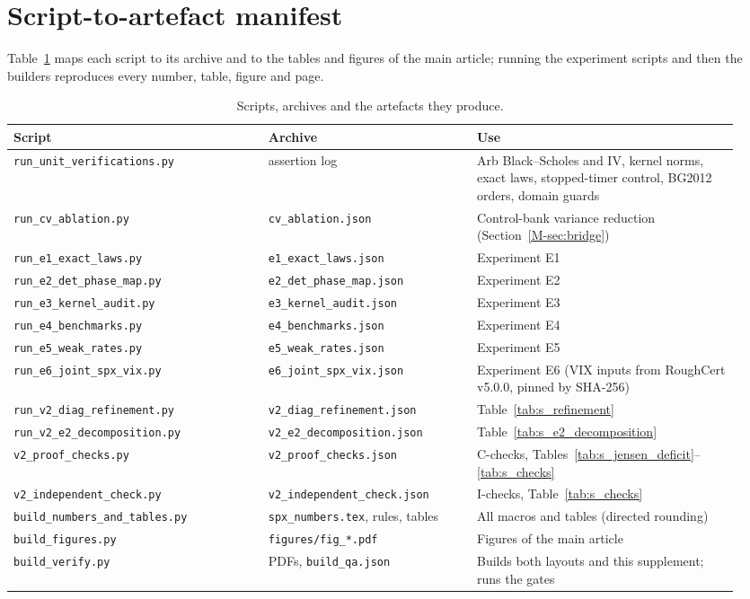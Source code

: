 \documentclass[11pt,a4paper]{article}
\newcommand{\mref}[1]{\ref*{M-#1}}
\newcommand{\RoughCert}{\textsf{RoughCert}}
\begin{document}
\section{Script-to-artefact manifest}
\label{sec:s_manifest}
Table~\ref{tab:s_manifest} maps each script to its archive and to the tables and figures of the main article; running the experiment scripts and then the builders reproduces every number, table, figure and page.

\begin{table}[!htb]
\centering
\caption{Scripts, archives and the artefacts they produce.}
\label{tab:s_manifest}
\footnotesize
\setlength{\tabcolsep}{4pt}
\begin{tabular}{@{} >{\raggedright\arraybackslash}p{0.33\linewidth} >{\raggedright\arraybackslash}p{0.27\linewidth} >{\raggedright\arraybackslash}p{0.34\linewidth} @{}}
\toprule
Script & Archive & Use \\
\midrule
\texttt{run\_unit\_verifications.py} & assertion log & Arb Black--Scholes and IV, kernel norms, exact laws, stopped-timer control, BG2012 orders, domain guards \\
\texttt{run\_cv\_ablation.py} & \texttt{cv\_ablation.json} & Control-bank variance reduction (Section~\mref{sec:bridge}) \\
\texttt{run\_e1\_exact\_laws.py} & \texttt{e1\_exact\_laws.json} & Experiment E1 \\
\texttt{run\_e2\_det\_phase\_map.py} & \texttt{e2\_det\_phase\_map.json} & Experiment E2 \\
\texttt{run\_e3\_kernel\_audit.py} & \texttt{e3\_kernel\_audit.json} & Experiment E3 \\
\texttt{run\_e4\_benchmarks.py} & \texttt{e4\_benchmarks.json} & Experiment E4 \\
\texttt{run\_e5\_weak\_rates.py} & \texttt{e5\_weak\_rates.json} & Experiment E5 \\
\texttt{run\_e6\_joint\_spx\_vix.py} & \texttt{e6\_joint\_spx\_vix.json} & Experiment E6 (VIX inputs from \RoughCert{} v5.0.0, pinned by SHA-256) \\
\texttt{run\_v2\_diag\_refinement.py} & \texttt{v2\_diag\_refinement.json} & Table~\ref{tab:s_refinement} \\
\texttt{run\_v2\_e2\_decomposition.py} & \texttt{v2\_e2\_decomposition.json} & Table~\ref{tab:s_e2_decomposition} \\
\texttt{v2\_proof\_checks.py} & \texttt{v2\_proof\_checks.json} & C-checks, Tables~\ref{tab:s_jensen_deficit}--\ref{tab:s_checks} \\
\texttt{v2\_independent\_check.py} & \texttt{v2\_independent\_check.json} & I-checks, Table~\ref{tab:s_checks} \\
\texttt{build\_numbers\_and\_tables.py} & \texttt{spx\_numbers.tex}, rules, tables & All macros and tables (directed rounding) \\
\texttt{build\_figures.py} & \texttt{figures/fig\_*.pdf} & Figures of the main article \\
\texttt{build\_verify.py} & PDFs, \texttt{build\_qa.json} & Builds both layouts and this supplement; runs the gates \\
\bottomrule
\end{tabular}
\end{table}
\FloatBarrier
\end{document}
